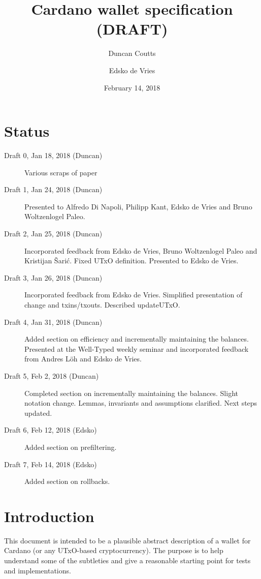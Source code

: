 \documentclass{article}
\begin{document}
\title{Cardano wallet specification (DRAFT)}
\author{Duncan Coutts \and Edsko de Vries}
\date{February 14, 2018}

\maketitle

\section*{Status}

\begin{description}
\item[Draft 0, Jan 18, 2018 (Duncan)] Various scraps of paper
\item[Draft 1, Jan 24, 2018 (Duncan)] Presented to Alfredo Di Napoli, Philipp Kant,
     Edsko de Vries and Bruno Woltzenlogel Paleo.
\item[Draft 2, Jan 25, 2018 (Duncan)] Incorporated feedback from Edsko de Vries,
     Bruno Woltzenlogel Paleo and Kristijan \v{S}ari\'{c}. Fixed UTxO
     definition. Presented to Edsko de Vries.
\item[Draft 3, Jan 26, 2018 (Duncan)] Incorporated feedback from Edsko de Vries.
     Simplified presentation of change and txins/txouts. Described updateUTxO.
\item[Draft 4, Jan 31, 2018 (Duncan)] Added section on efficiency and incrementally
     maintaining the balances. Presented at the Well-Typed weekly seminar and
     incorporated feedback from Andres L\"oh and Edsko de Vries.
\item[Draft 5, Feb 2, 2018 (Duncan)] Completed section on incrementally maintaining the
     balances. Slight notation change. Lemmas, invariants and assumptions
     clarified. Next steps updated.
\item[Draft 6, Feb 12, 2018 (Edsko)] Added section on prefiltering.
\item[Draft 7, Feb 14, 2018 (Edsko)] Added section on rollbacks.
\end{description}

\section{Introduction}

This document is intended to be a plausible abstract description of a wallet
for Cardano (or any UTxO-based cryptocurrency). The purpose is to help
understand some of the subtleties and give a reasonable starting point for
tests and implementations.
\end{document}
